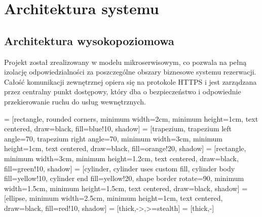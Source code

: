 \newpage
\renewcommand{\sectioncolor}{chap2}
\section{Architektura systemu}

\subsection{Architektura wysokopoziomowa}
Projekt został zrealizowany w modelu mikroserwisowym, co pozwala na pełną izolację odpowiedzialności za poszczególne obszary biznesowe systemu rezerwacji. Całość komunikacji zewnętrznej opiera się na protokole HTTPS i jest zarządzana przez centralny punkt dostępowy, który dba o bezpieczeństwo i odpowiednie przekierowanie ruchu do usług wewnętrznych.

\usetikzlibrary{shapes.geometric, arrows, positioning, shadows}

 = [rectangle, rounded corners, minimum width=2cm, minimum height=1cm, text centered, draw=black, fill=blue!10, shadow]
 = [trapezium, trapezium left angle=70, trapezium right angle=70, minimum width=3cm, minimum height=1cm, text centered, draw=black, fill=orange!20, shadow]
 = [rectangle, minimum width=3cm, minimum height=1.2cm, text centered, draw=black, fill=green!10, shadow]
 = [cylinder, cylinder uses custom fill, cylinder body fill=yellow!10, cylinder end fill=yellow!20, shape border rotate=90, minimum width=1.5cm, minimum height=1.5cm, text centered, draw=black, shadow]
 = [ellipse, minimum width=2.5cm, minimum height=1cm, text centered, draw=black, fill=red!10, shadow]
 = [thick,->,>=stealth]
 = [thick,-]

